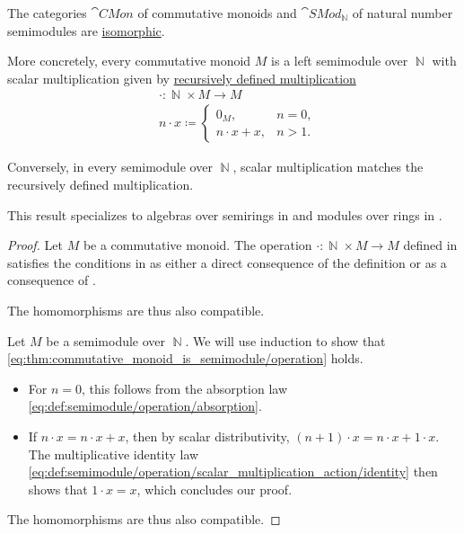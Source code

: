 \begin{proposition}\label{thm:commutative_monoid_is_semimodule}
  The categories \( \hyperref[def:monoid/category]{\cat{CMon}} \) of commutative monoids and \( \hyperref[def:semimodule/category]{\cat{SMod}_\BbbN} \) of natural number semimodules are \hyperref[rem:category_similarity/isomorphism]{isomorphic}.

  More concretely, every commutative monoid \( M \) is a left semimodule over \( \BbbN \) with scalar multiplication given by \hyperref[con:additive_semigroup/multiplication]{recursively defined multiplication}
  \begin{equation}\label{eq:thm:commutative_monoid_is_semimodule/operation}
    \begin{aligned}
      &\cdot: \BbbN \times M \to M \\
      &n \cdot x \coloneqq \begin{cases}
        0_M,           &n = 0, \\
        n \cdot x + x, &n > 1.
      \end{cases}
    \end{aligned}
  \end{equation}

  Conversely, in every semimodule over \( \BbbN \), scalar multiplication matches the recursively defined multiplication.
\end{proposition}
\begin{comments}
  \item This result specializes to algebras over semirings in  and modules over rings in .
\end{comments}
\begin{proof}
  \SufficiencySubProof Let \( M \) be a commutative monoid. The operation \( \cdot: \BbbN \times M \to M \) defined in  satisfies the conditions in  as either a direct consequence of the definition or as a consequence of .

  The homomorphisms are thus also compatible.

  \NecessitySubProof Let \( M \) be a semimodule over \( \BbbN \). We will use induction to show that \eqref{eq:thm:commutative_monoid_is_semimodule/operation} holds.
  \begin{itemize}
    \item For \( n = 0 \), this follows from the absorption law \eqref{eq:def:semimodule/operation/absorption}.
    \item If \( n \cdot x = n \cdot x + x \), then by scalar distributivity, \( (n + 1) \cdot x = n \cdot x + 1 \cdot x \). The multiplicative identity law \eqref{eq:def:semimodule/operation/scalar_multiplication_action/identity} then shows that \( 1 \cdot x = x \), which concludes our proof.
  \end{itemize}

  The homomorphisms are thus also compatible.
\end{proof}

